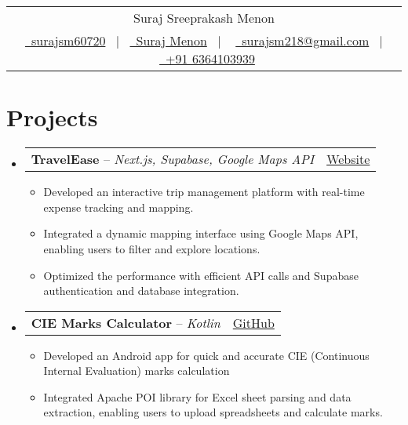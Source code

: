\documentclass[a4paper,12pt]{article}
\makeatletter
\newcommand{\resumeItem}[1]{
  \item\small{
    {#1}\vspace{-2pt}
  }
}
\newcommand{\expSubheading}[3]{
  \vspace{-1pt}\item
    \begin{tabular*}{0.97\textwidth}{l@{\extracolsep{\fill}}r}
      \textbf{#1} -- \textit{#2} & #3 \\
    \end{tabular*}\vspace{-5pt}
}
\newcommand{\resumeSubHeadingListStart}{\begin{itemize}[leftmargin=*]}
\newcommand{\resumeSubHeadingListEnd}{\end{itemize}}
\newcommand{\resumeItemListStart}{\begin{itemize}}
\newcommand{\resumeItemListEnd}{\end{itemize}\vspace{-5pt}}
\makeatother
\begin{document}
\pagestyle{empty}


\begin{tabularx}{\linewidth}{@{} C @{}}
	\Huge{Suraj Sreeprakash Menon}                                              \\[7.5pt]
	\href{https://github.com/surajsm60720}{\raisebox{-0.05\height}\faGithub\ surajsm60720} \ $|$ \
	\href{https://www.linkedin.com/in/suraj-menon-a581ab305/}{\raisebox{-0.05\height}\faLinkedin\ Suraj Menon} \ $|$ \
	\href{mailto:surajsm218@gmail.com}{\raisebox{-0.05\height}\faEnvelope \ surajsm218@gmail.com} \ $|$ \
	\href{tel:+916364103939}{\raisebox{-0.05\height}\faMobile \ +91 6364103939} \\
\end{tabularx}

\section{Projects}
\resumeSubHeadingListStart

\expSubheading
{TravelEase}{Next.js, Supabase, Google Maps API}{\href{http://travel-ease-mocha.vercel.app}{Website}}
\resumeItemListStart
\resumeItem
{Developed an interactive trip management platform with real-time expense tracking and mapping.}
\resumeItem
{Integrated a dynamic mapping interface using Google Maps API, enabling users to filter and explore locations.}
\resumeItem
{Optimized the performance with efficient API calls and Supabase authentication and database integration.}
\resumeItemListEnd


\expSubheading
{CIE Marks Calculator}{Kotlin}{\href{http://nammalakes.github.io/dashboard}{GitHub}}
\resumeItemListStart
\resumeItem
{Developed an Android app for quick and accurate CIE (Continuous Internal Evaluation) marks calculation}
\resumeItem
{Integrated Apache POI library for Excel sheet parsing and data extraction, enabling users to upload spreadsheets and calculate marks.}
\resumeItemListEnd

\resumeSubHeadingListEnd
\end{document}
